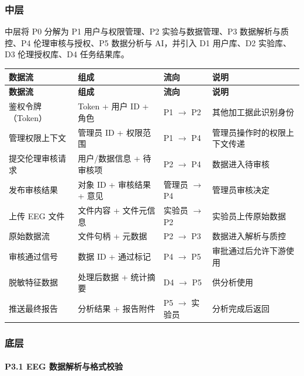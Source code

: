\subsubsection{中层}

中层将 P0 分解为 P1 用户与权限管理、P2 实验与数据管理、P3 数据解析与质控、P4 伦理审核与授权、P5 数据分析与 AI，并引入 D1 用户库、D2 实验库、D3 伦理授权库、D4 任务结果库。

{\small
\begin{longtable}{|p{26mm}|p{48mm}|p{26mm}|p{28mm}|}
\hline
\textbf{数据流} & \textbf{组成} & \textbf{流向} & \textbf{说明}\\\hline
\endfirsthead
\hline
\textbf{数据流} & \textbf{组成} & \textbf{流向} & \textbf{说明}\\\hline
\endhead
鉴权令牌（Token）& Token + 用户 ID + 角色 & P1 $\to$ P2 & 其他加工据此识别身份 \\ \hline
管理权限上下文 & 管理员 ID + 权限范围 & P1 $\to$ P4 & 管理员操作时的权限上下文传递 \\ \hline
提交伦理审核请求 & 用户/数据信息 + 待审核项 & P2 $\to$ P4 & 数据进入待审核 \\ \hline
发布审核结果 & 对象 ID + 审核结果 + 意见 & 管理员 $\to$ P4 & 管理员审核决定 \\ \hline
上传 EEG 文件 & 文件内容 + 文件元信息 & 实验员 $\to$ P2 & 实验员上传原始数据 \\ \hline
原始数据流 & 文件句柄 + 元数据 & P2 $\to$ P3 & 数据进入解析与质控 \\ \hline
审核通过信号 & 数据 ID + 通过标记 & P4 $\to$ P5 & 审批通过后允许下游使用 \\ \hline
脱敏特征数据 & 处理后数据 + 统计摘要 & D4 $\to$ P5 & 供分析使用 \\ \hline
推送最终报告 & 分析结果 + 报告附件 & P5 $\to$ 实验员 & 分析完成后返回 \\ \hline
\end{longtable}
}

\subsubsection{底层}

\paragraph{P3.1 EEG 数据解析与格式校验}

